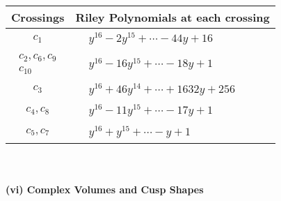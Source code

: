 \documentclass[1p]{elsarticle_modified}
\theoremstyle{definition}
\begin{document}
\begin{tabular}{m{50pt}|m{274pt}}
Crossings & \hspace{64pt}Riley Polynomials at each crossing \\
\hline $$\begin{aligned}c_{1}\end{aligned}$$&$\begin{aligned}
&y^{16}-2 y^{15}+\cdots-44 y+16
\end{aligned}$\\
\hline $$\begin{aligned}c_{2},c_{6},c_{9}\\c_{10}\end{aligned}$$&$\begin{aligned}
&y^{16}-16 y^{15}+\cdots-18 y+1
\end{aligned}$\\
\hline $$\begin{aligned}c_{3}\end{aligned}$$&$\begin{aligned}
&y^{16}+46 y^{14}+\cdots+1632 y+256
\end{aligned}$\\
\hline $$\begin{aligned}c_{4},c_{8}\end{aligned}$$&$\begin{aligned}
&y^{16}-11 y^{15}+\cdots-17 y+1
\end{aligned}$\\
\hline $$\begin{aligned}c_{5},c_{7}\end{aligned}$$&$\begin{aligned}
&y^{16}+y^{15}+\cdots- y+1
\end{aligned}$\\
\hline
\end{tabular}\\~\\
\newpage\flushleft \textbf{(vi) Complex Volumes and Cusp Shapes}
\end{document}
